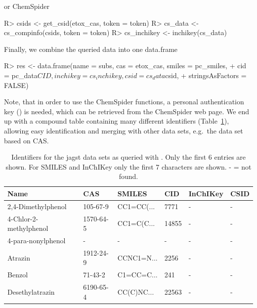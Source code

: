 \documentclass[article, shortnames]{jss}\usepackage[]{graphicx}\usepackage[]{color}
\begin{document}
or ChemSpider
\begin{CodeChunk}
\begin{CodeInput}
R> csids <- get_csid(etox_cas, token = token)
R> cs_data <- cs_compinfo(csids, token = token)
R> cs_inchikey <- inchikey(cs_data)
\end{CodeInput}
\end{CodeChunk}

Finally, we combine the queried data into one data.frame
\begin{CodeChunk}
\begin{CodeInput}
R> res <- data.frame(name = subs, cas = etox_cas, smiles = pc_smiles, 
+    cid = pc_data$CID, inchikey = cs_inchikey, csid = cs_data$csid, 
+    stringsAsFactors = FALSE)
\end{CodeInput}
\end{CodeChunk}

Note, that in order to use the ChemSpider functions, a personal authentication key () is needed, which can be retrieved from the ChemSpider web page. 
We end up with a compound table containing many different identifiers (Table~\ref{tab:comptable}), allowing easy identification and merging with other data sets, e.g.\ the  data set based on CAS.

\begin{table}[ht]
\centering
\begin{CodeChunk}
\begin{tabular}{llllll}
  \toprule
Name & CAS & SMILES & CID & InChIKey & CSID \\ 
  \midrule
2,4-Dimethylphenol & 105-67-9 & CC1=CC(... & 7771 & - & - \\ 
  4-Chlor-2-methylphenol & 1570-64-5 & CC1=C(C... & 14855 & - & - \\ 
  4-para-nonylphenol & - & - & - & - & - \\ 
  Atrazin & 1912-24-9 & CCNC1=N... & 2256 & - & - \\ 
  Benzol & 71-43-2 & C1=CC=C... & 241 & - & - \\ 
  Desethylatrazin & 6190-65-4 & CC(C)NC... & 22563 & - & - \\ 
   \bottomrule
\end{tabular}
\end{CodeChunk}
\caption{Identifiers for the jagst data sets as queried with . Only the first 6 entries are shown. For SMILES and InChIKey only the first 7 characters are shown. - = not found.}
\label{tab:comptable}
\end{table}
\end{document}
